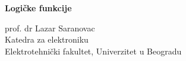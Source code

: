 \begin{frame}[label=01-s001]{}
\vspace{6mm}
{\fontsize{26}{30}\selectfont\bfseries Logičke funkcije\par}
\vspace{4mm}{\color{Accent}\rule{36mm}{1.2pt}}\par
\vspace{5mm}
prof. dr Lazar Saranovac\\
Katedra za elektroniku\\
Elektrotehnički fakultet, Univerzitet u Beogradu\par
\vspace{4mm}
\end{frame}
